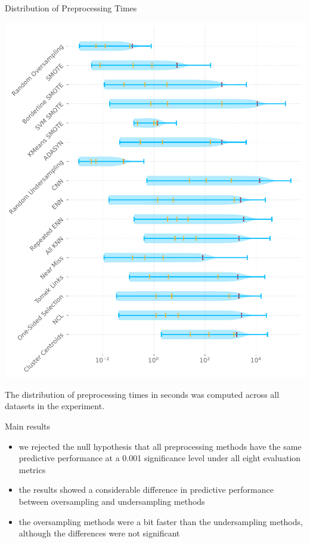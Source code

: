 \documentclass[a0paper, portrait, fontscale=0.255]{baposter}
\begin{document}
\begin{poster}
\begin{posterbox}[column=1, name=result-times]{Distribution of Preprocessing Times}
    \begin{center}
        \includegraphics[width=\linewidth]{../thesis/figures/preprocessing_times.pdf}
    \end{center}

    The distribution of preprocessing times in seconds was computed across all datasets in the
    experiment.
\end{posterbox}


\begin{posterbox}[
    column=1, name=result-main, below=result-times,
    headerColorOne=green!50!yellow, boxColorOne=green!10
]{Main results}
    \begin{itemize}[leftmargin=1.2em]
        \item we rejected the null hypothesis that all preprocessing methods have the same
            predictive performance at a 0.001 significance level under all eight evaluation metrics
        \item the results showed a considerable difference in predictive performance between
            oversampling and undersampling methods
        \item the oversampling methods were a bit faster than the undersampling methods, although
            the differences were not significant
    \end{itemize}
\end{posterbox}



\end{poster}
\end{document}
